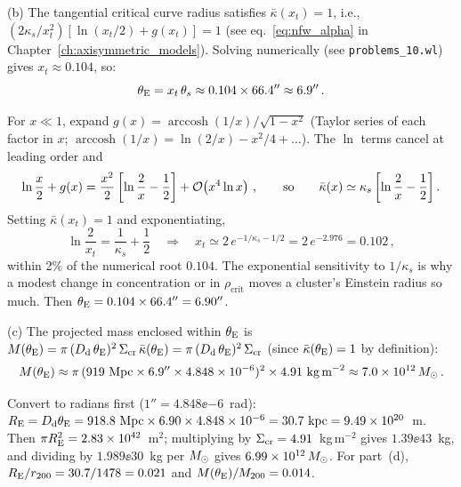 (b) The tangential critical curve radius satisfies
$\bar{\kappa}(x_t) = 1$, i.e.,
$(2\kappa_s / x_t^2)[\ln(x_t/2) + g(x_t)] = 1$
(see eq.~\eqref{eq:nfw_alpha} in Chapter~\ref{ch:axisymmetric_models}).
Solving numerically (see \texttt{problems\_10.wl}) gives
$x_t \approx 0.104$, so:
\begin{equation*}
    \theta_{\mathrm{E}} = x_t\, \theta_s \approx 0.104 \times 66.4'' \approx 6.9'' \,.
\end{equation*}

\begin{derivation}
For $x \ll 1$, expand $g(x) = \operatorname{arccosh}(1/x)/\sqrt{1-x^2}$
(Taylor series of each factor in $x$; $\operatorname{arccosh}(1/x) =
\ln(2/x) - x^2/4 + \dots$).  The $\ln$ terms cancel at leading order and
\begin{equation*}
    \ln\frac{x}{2} + g(x) = \frac{x^2}{2}\left[\ln\frac{2}{x}
    - \frac12\right] + \mathcal{O}\!\left(x^4\ln x\right)\,,
    \qquad\text{so}\qquad
    \bar\kappa(x) \simeq \kappa_s\left[\ln\frac{2}{x} - \frac12\right].
\end{equation*}
Setting $\bar\kappa(x_t) = 1$ and exponentiating,
\begin{equation*}
    \ln\frac{2}{x_t} = \frac{1}{\kappa_s} + \frac12
    \quad\Longrightarrow\quad
    x_t \simeq 2\,e^{-1/\kappa_s - 1/2} = 2\,e^{-2.976} = 0.102\,,
\end{equation*}
within 2\% of the numerical root $0.104$.  The exponential sensitivity to
$1/\kappa_s$ is why a modest change in concentration or in
$\rho_{\mathrm{crit}}$ moves a cluster's Einstein radius so much.  Then
$\theta_{\mathrm{E}} = 0.104 \times 66.4'' = 6.90''$.
\end{derivation}

(c) The projected mass enclosed within $\theta_{\mathrm{E}}$ is
$M(\theta_{\mathrm{E}}) = \pi\,(D_{\mathrm{d}}\,\theta_{\mathrm{E}})^2\,\Sigma_{\mathrm{cr}}\,\bar\kappa(\theta_{\mathrm{E}})
= \pi\,(D_{\mathrm{d}}\,\theta_{\mathrm{E}})^2\,\Sigma_{\mathrm{cr}}$ (since $\bar\kappa(\theta_{\mathrm{E}})=1$ by
definition):
\begin{equation*}
    M(\theta_{\mathrm{E}}) \approx \pi\,(919~\text{Mpc} \times 6.9'' \times
    4.848\times 10^{-6})^2 \times 4.91~\text{kg\,m}^{-2}
    \approx 7.0\times 10^{12}\,M_{\odot} \,.
\end{equation*}

\begin{derivation}
Convert to radians first ($1'' = 4.848\ee{-6}$~rad):
$R_{\mathrm{E}} = D_{\mathrm{d}}\theta_{\mathrm{E}} = 918.8~\text{Mpc}\times 6.90\times4.848\times 10^{-6}
= 30.7~\text{kpc} = 9.49\times 10^{20}$~m.  Then
$\pi R_{\mathrm{E}}^2 = 2.83\times 10^{42}$~m$^2$; multiplying by
$\Sigma_{\mathrm{cr}} = 4.91$~kg\,m$^{-2}$ gives $1.39\ee{43}$~kg, and dividing by
$1.989\ee{30}$~kg per $M_{\odot}$ gives $6.99\times 10^{12}\,M_{\odot}$.  For part~(d),
$R_{\mathrm{E}}/r_{200} = 30.7/1478 = 0.021$ and $M(\theta_{\mathrm{E}})/M_{200} = 0.014$.
\end{derivation}

